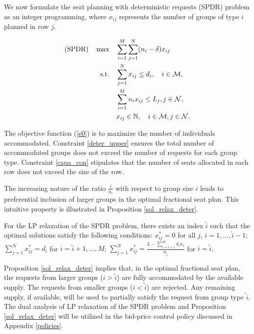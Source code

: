We now formulate the seat planning with deterministic requests (SPDR) problem as an integer programming, where $x_{ij}$ represents the number of groups of type $i$ planned in row $j$. 

\begin{align}
(\text{SPDR}) \quad \max \quad & \sum_{i=1}^{M}  \sum_{j= 1}^{N} (n_i - \delta) x_{ij} \label{e0} \\
\text {s.t.} \quad & \sum_{j= 1}^{N} x_{ij} \leq d_{i}, \quad i \in \mathcal{M}, \label{deter_upper}\\ 
& \sum_{i=1}^{M} n_{i} x_{ij} \leq L_j, j \in \mathcal{N}, \label{capa_con} \\
& x_{ij} \in \mathbb{N}, \quad i \in \mathcal{M}, j \in \mathcal{N}. \notag 
\end{align}


The objective function (\ref{e0}) is to maximize the number of individuals accommodated. Constraint \eqref{deter_upper} ensures the total number of accommodated groups does not exceed the number of requests for each group type. Constraint \eqref{capa_con} stipulates that the number of seats allocated in each row does not exceed the size of the row.

The increasing nature of the ratio $\frac{i}{n_i}$ with respect to group size $i$ leads to preferential inclusion of larger groups in the optimal fractional seat plan. This intuitive property is illustrated in Proposition \ref{sol_relax_deter}. 




\begin{prop}\label{sol_relax_deter}
For the LP relaxation of the \textup{SPDR} problem, there exists an index $\tilde{i}$ such that the optimal solutions satisfy the following conditions: $x_{ij}^{*} = 0$ for all $j$, $i = 1,\ldots, \tilde{i}-1$; $\sum_{j=1}^{N} x_{ij}^{*} = d_{i}$ for $i = \tilde{i}+1,\ldots, M$; $\sum_{j=1}^{N} x_{ij}^{*} = \frac{L - \sum_{i = \tilde{i}+1}^{M} {d_i n_i}}{n_{\tilde{i}}}$ for $i = \tilde{i}$.
\end{prop}

Proposition \ref{sol_relax_deter} implies that, in the optimal fractional seat plan, the requests from larger groups ($i > \tilde{i}$) are fully accommodated by the available supply. The requests from smaller groups ($i < \tilde{i}$) are rejected. Any remaining supply, if available, will be used to partially satisfy the request from group type $\tilde{i}$. The dual analysis of LP relaxation of the \textup{SPDR} problem and Proposition \ref{sol_relax_deter} will be utilized in the bid-price control policy discussed in Appendix \ref{policies}.

